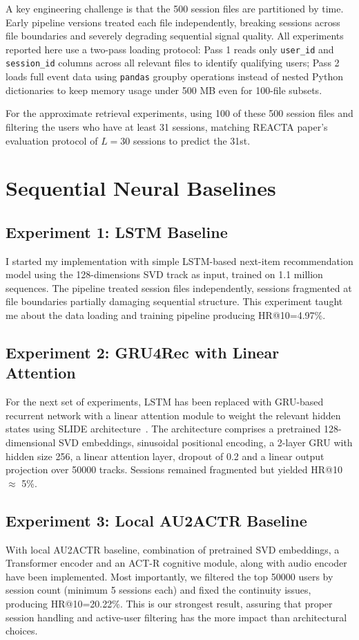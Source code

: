 \documentclass[conference]{IEEEtran}
\begin{document}
A key engineering challenge is that the 500 session files are partitioned by
time. Early pipeline versions treated each file independently, breaking sessions
across file boundaries and severely degrading sequential signal quality. All
experiments reported here use a two-pass loading protocol: Pass 1 reads only
\texttt{user\_id} and \texttt{session\_id} columns across all relevant files to
identify qualifying users; Pass 2 loads full event data using \texttt{pandas}
groupby operations instead of nested Python dictionaries to keep memory usage
under 500 MB even for 100-file subsets.

For the approximate retrieval experiments, using 100 of these 500 session files
and filtering the users who have at least 31 sessions, matching REACTA paper's
evaluation protocol of $L = 30$ sessions to predict the 31st.

\section{Sequential Neural Baselines}

\subsection{Experiment 1: LSTM Baseline}
I started my implementation with simple LSTM-based next-item recommendation
model using the 128-dimensions SVD track as input, trained on 1.1 million
sequences. The pipeline treated session files independently, sessions
fragmented at file boundaries partially damaging sequential structure. This
experiment taught me about the data loading and training pipeline producing
HR@10=4.97\%.

\subsection{Experiment 2: GRU4Rec with Linear Attention}
For the next set of experiments, LSTM has been replaced with GRU-based
recurrent network with a linear attention module to weight the relevant hidden
states using SLIDE architecture~\cite{tran2025reacta}. The architecture
comprises a pretrained 128-dimensional SVD embeddings, sinusoidal positional
encoding, a 2-layer GRU with hidden size 256, a linear attention layer,
dropout of 0.2 and a linear output projection over 50000 tracks. Sessions
remained fragmented but yielded HR@10 $\approx$ 5\%.

\subsection{Experiment 3: Local AU2ACTR Baseline}
With local AU2ACTR baseline, combination of pretrained SVD embeddings, a
Transformer encoder and an ACT-R cognitive module, along with audio encoder
have been implemented. Most importantly, we filtered the top 50000 users by
session count (minimum 5 sessions each) and fixed the continuity issues,
producing HR@10=20.22\%. This is our strongest result, assuring that proper
session handling and active-user filtering has the more impact than
architectural choices.
\end{document}
